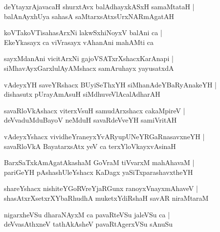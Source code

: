 \documentclass[twoside,12pt,openright]{book}
\newcounter{shloka}[chapter]
\begin{document}
\begin{shloka}%
deYtayxrAjavacaH shurxtAvx balAdhayxkASxH samaMtataH |\\
balAnAyxhUya sahasA saMtarxsAtxsUrxNARmAgatAH 
\end{shloka}

\begin{shloka}%
koVTakoVTisahasArxNi lakwSxhiNoyxV balAni ca |\\
EkeYkasayx ca viVrasayx vAhanAni mahAMti ca 
\end{shloka}

\begin{shloka}%
sayxMdanAni vicitArxNi gajoVSATxrXshacxKarAnapi |\\
siMhavAyxGarxlulAyAMshacx samAruhayx yayusatxdA 
\end{shloka}

\begin{shloka}%
vAdeyxYH saveYRshacx BUyiSeThxYH siMhanAdeYBaRyAnakeYH |\\
dishasutx pUrayAmAsuH siMdhuveVlAcalAdharAH 
\end{shloka}

\begin{shloka}%
savaRloVkAshacx viterxVsuH samudArxshacx cakaMpireV |\\
deVvaduMduBayoV neMduH savaRdeVveYH samiVritAH 
\end{shloka}

\begin{shloka}%
vAdeyxYshacx vividheYraneyxYvARyupUNeYRGaRnasavxneYH |\\
savaRloVkA BayatarxsAtx yeV ca terxYloVkayxvAsinaH 
\end{shloka}

\begin{shloka}%
BarxSaTxkAmAgatAkashaM GoVraM tiVvarxM mahAhavaM |\\
pariGeYH pAshashUleYshacx KaDagx yaSiTxparashavxtheYH
\end{shloka}

\begin{shloka}%
shareYshacx nishiteYGoRVreYjaRGunx ranoyxVnayxmAhaveV |\\
shasAtxrXsetxrXYbaRhudhA muketxYdiRshaH savAR niraMtaraM 
\end{shloka}

\begin{shloka}%
nigarxheVSu dharaNAyxM ca pavaRteVSu jaleVSu ca |\\
deVvasAthxneV tathAkAsheV pavaRtAgerxVSu sAnuSu
\end{shloka}
\end{document}
